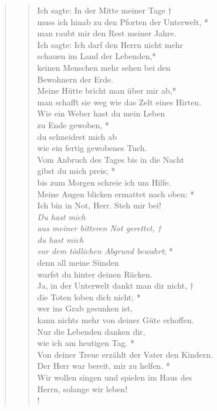 

\def\greinitialformat#1{{\fontsize{40}{40}\selectfont #1}}
\gresetfirstlineaboveinitial{\small \textcolor{red}{Is 38}}{}
\setaboveinitialseparation{0.72mm}


\begin{quote}
\begin{verse}
Ich sagte: In der Mitte meiner Tage †\\
muss ich hinab zu den Pforten der Unterwelt, *\\
man raubt mir den Rest meiner Jahre.\\
\vin Ich sagte: Ich darf den Herrn nicht mehr\\ 
\vin schauen im Land der Lebenden,*\\
\vin keinen Menschen mehr sehen bei den\\ 
\vin Bewohnern der Erde.\\
Meine Hütte bricht man über mir ab,*\\
man schafft sie weg wie das Zelt eines Hirten.\\
\vin Wie ein Weber hast du mein Leben \\ 
\vin zu Ende gewoben, *\\
\vin du schneidest mich ab\\ 
\vin wie ein fertig gewobenes Tuch.\\
Vom Anbruch des Tages bis in die Nacht\\
gibst du mich preis; *\\
bis zum Morgen schreie ich um Hilfe.\\
\vin Meine Augen blicken ermattet nach oben: *\\
\vin Ich bin in Not, Herr. Steh mir bei!\\
\textit{Du hast mich\\
aus meiner bitteren Not gerettet, †\\
du hast mich\\
vor dem tödlichen Abgrund bewahrt}; *\\
denn all meine Sünden\\
warfst du hinter deinen Rücken.\\
\vin Ja, in der Unterwelt dankt man dir nicht, †\\ 
\vin die Toten loben dich nicht; *\\
\vin wer ins Grab gesunken ist,\\ 
\vin kann nichts mehr von deiner Güte erhoffen.\\
Nur die Lebenden danken dir,\\
wie ich am heutigen Tag. *\\
Von deiner Treue erzählt der Vater den Kindern.\\
\vin Der Herr war bereit, mir zu helfen. *\\
\vin Wir wollen singen und spielen im Haus des\\ \vin  Herrn, 
solange wir leben! \\!


\end{verse}
\end{quote}
